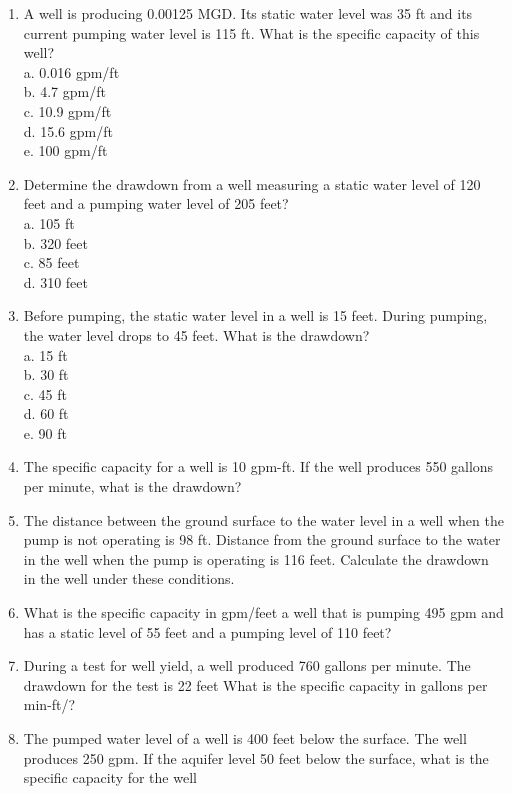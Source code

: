 \documentclass{article}
\begin{document}
\begin{enumerate}
\item A well is producing 0.00125 MGD. Its static water level was 35 ft and its current pumping water level is 115 ft. What is the specific capacity of this well? \\
a. 0.016 gpm/ft\\
b. 4.7 gpm/ft\\
c. 10.9 gpm/ft\\
d. 15.6 gpm/ft\\
e. 100 gpm/ft\\

\item Determine the drawdown from a well measuring a static water level of 120 feet and a pumping water level of 205 feet?\\
a. 105 ft\\
b. 320 feet\\
c. 85 feet\\
d. 310 feet\\

\item Before pumping, the static water level in a well is 15 feet. During pumping, the water
level drops to 45 feet. What is the drawdown?\\
a. 15 ft\\
b. 30 ft\\
c. 45 ft\\
d. 60 ft\\
e. 90 ft\\

\item The specific capacity for a well is 10 gpm-ft. If the well produces 550 gallons per minute, what is the drawdown?

\item The distance between the ground surface to the water level in a well when the pump is not operating is 98 ft.  Distance from the ground surface to the water in the well when the pump is operating is 116 feet. Calculate the drawdown in the well under these conditions.

\item What is the specific capacity in gpm/feet a well that is pumping 495 gpm and has a
static level of 55 feet and a pumping level of 110 feet?

\item During a test for well yield, a well produced 760 gallons per minute. The drawdown for the test is 22 feet What is the specific capacity in gallons per min-ft/?

\item The pumped water level of a well is 400 feet below the surface. The well produces  250 gpm.  If the aquifer level 50 feet below the surface, what is the specific capacity for the well

\end{enumerate}
\end{document}
